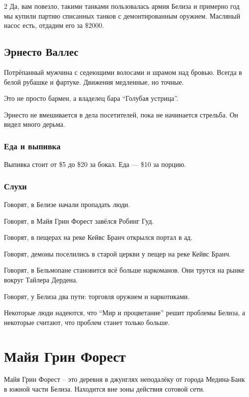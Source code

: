 \documentclass[twoside]{article}
\begin{document}
\begin{multicols}{2}
Да, вам повезло, такими танками пользовалась армия Белиза и примерно год
мы купили партию списанных танков с демонтированным оружием. Масляный
насос есть, отдадим его за \$2000.

\subsection{Эрнесто Валлес}\label{ernesto-valles}

Потрёпанный мужчина с седеющими волосами и шрамом над бровью. Всегда в
белой рубашке и фартуке. Движения медленные, но точные.

Это не просто бармен, а владелец бара \enquote{Голубая устрица}.

Эрнесто не вмешивается в дела посетителей, пока не начинается стрельба.
Он видел много дерьма.

\subsubsection{Еда и выпивка}\label{food-drink}

Выпивка стоит от \$5 до \$20 за бокал. Еда --- \$10 за порцию.

\subsubsection{Слухи}\label{rumors-bartender}

Говорят, в Белизе начали пропадать люди.

Говорят, в Майя Грин Форест завёлся Робинг Гуд.

Говорят, в пещерах на реке Кейвс Бранч открылся портал в ад.

Говорят, демоны поселились в старой церкви у пещер на реке Кейвс Бранч.

Говорят, в Бельмопане становится всё больше наркоманов. Они трутся на
рынке вокруг Тайлера Дердена.

Говорят, у Белиза два пути: торговля оружием и наркотиками.

Некоторые люди надеются, что \enquote{Мир и процветание} решит проблемы Белиза,
а некоторые считают, что проблем станет только больше.

\section{Майя Грин Форест}\label{maya-green-forest}

Майя Грин Форест -- это деревня в джунглях неподалёку от города
Медина-Банк в южной части Белиза. Находится вне зоны действия сотовой
сети.


\end{multicols}
\end{document}
